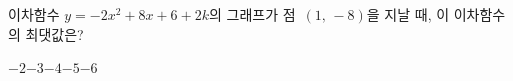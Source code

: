 이차함수 $y=-2x^2+8x+6+2k$의 그래프가 점~$(1,\,-8)$을 지날 때, 이 이차함수의 최댓값은? 
\begin{choices32}{$-2$}{$-3$}{$-4$}{$-5$}{$-6$}\end{choices32}
